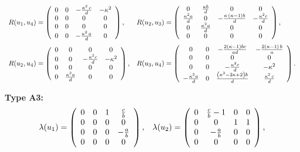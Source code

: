 \documentclass{amsart}
\theoremstyle{plain}
\theoremstyle{remark}
\begin{document}
{{\begin{equation}
\begin{array}{ll}
R(u_1,u_4)=\left( \begin {array}{cccc} 0&0&-{\frac { \kappa ^2 \,c}{d}}& -\kappa ^2 \\0&0&0&0\\ 0&0&0&0\\ 0&0&-{\frac { \kappa ^2 \,a}{d}}&0\end {array} \right), &R(u_2,u_3)=\left( \begin {array}{cccc} 0&{\frac {{\kappa} b}{d}}&0&0\\{\frac {{\kappa}^{2}a}{d}}&0&-{\frac {\kappa\, \left( \kappa-1 \right) b}{d}}&-{\frac {{\kappa}^{2}c}{d}}\\0&{\frac {{\kappa}^{2}a}{d}}&0&0\\0&0&0&0\end {array} \right), \vspace{2mm}\\
R(u_2,u_4)=\left( \begin {array}{cccc} 0&0&0&0\\0&0&-{\frac {{\kappa}^{2}c}{d}}&-{\kappa}^{2}\\0&0&0&0\\0&{\frac {{\kappa}^{2}a}{d}}&0&0\end {array} \right), &R(u_3,u_4)=\left( \begin {array}{cccc} 0&0&-{\frac { 2\left( \kappa-1 \right) bc}{ad}} &-{\frac { 2\left( \kappa -1\right)  \, b  }{a}}\\0&0&0&0\\0&0&-{\frac {{\kappa}^{2}c}{d}}& -\kappa^2 \\-{\frac {\kappa^2 a}{d}}&0&{\frac { \left( \kappa ^2 -2\kappa +2\right)  b}{d}}&{\frac { \kappa ^2 \,c}{d}} \end {array}\right).
\end{array}
\end{equation}
}

\smallskip\noindent
{\bf Type A3:}
{\small \begin{equation}\label{lambdaA3}
\begin{array}{ll}
\lambda(u_1)=\left( \begin {array}{cccc} 0&0&1&{\frac {c}{b}}\\0&0&0&0\\0&0&0&-{\frac {a}{b}}\\0&0&0&0\end {array} \right) , & 
\lambda(u_2)=\left(\begin {array}{cccc}
 0 & {\frac {c}{b} -1} & 0 & 0\\
 0 & 0 & 1 & 1\\
 0 & -{\frac {a}{b}} & 0 & 0\\
 0 & 0 & 0 & 0
 \end {array} \right), 
\vspace{2mm}\\


\end{array}
\end{equation}}}
\end{document}
